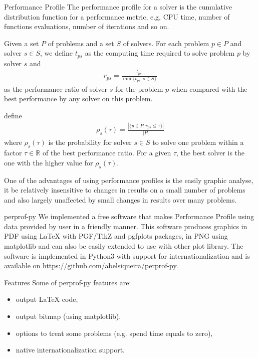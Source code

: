 \documentclass[paperwidth=90cm,paperheight=120cm,portrait]{baposter}
\begin{document}
\begin{poster}
\begin{posterbox}[name=perprof,below=intro]{Performance Profile}
        The performance profile for a solver is the cumulative distribution
        function for a performance metric, e.g, CPU time, number of functions
        evaluations, number of iterations and so on.

        Given a set $P$ of problems and a set $S$ of solvers. For each problem $p
        \in P$ and solver $s \in S$, we define $t_{ps}$ as the computing time
        required to solve problem $p$ by solver $s$ and
        \begin{align*}
          r_{ps} = \frac{t_{ps}}{\min\{t_{ps}: s \in S\}}
        \end{align*}
        as the performance ratio of solver $s$ for the problem $p$ when compared
        with the best performance by any solver on this problem.

        \citeauthor{Dolan2001} define
        \begin{align*}
          \rho_s(\tau) = \frac{| \{p \in P: r_{ps} \leq \tau\} |}{| P |}
        \end{align*}
        where $\rho_s(\tau)$ is the probability for solver $s \in S$ to solve one
        problem within a factor $\tau \in \mathbb{R}$ of the best performance
        ratio. For a given $\tau$, the best solver is the one with the higher
        value for $\rho_s(\tau)$.

        One of the advantages of using performance profiles is the easily graphic
        analyse, it be relatively insensitive to changes in results on a small
        number of problems and also largely unaffected by small changes in
        results over many problems.
        \end{posterbox}

       \begin{posterbox}[name=perprof-py,below=perprof] {perprof-py}
       We implemented a free software that makes Performance
        Profile using data provided by user in a friendly manner. This software
        produces graphics in PDF using LaTeX with PGF/TikZ\nocite{TikZ} and
        pgfplots\nocite{pgfplots} packages, in PNG using
        matplotlib\nocite{Hunter:2007} and can also be easily extended to use with
        other plot library. The software is implemented in Python3 with support
        for internationalization and is available on
        \url{https://github.com/abelsiqueira/perprof-py}.
      \end{posterbox}

    \begin{posterbox}[name=features,below=perprof-py]{Features}
        Some of perprof-py features are:
        \begin{itemize}
          \item output LaTeX code,
          \item output bitmap (using matplotlib),
          \item options to treat some problems (e.g. spend time equals to
            zero),
          \item native internationalization support.


\end{itemize}
\end{posterbox}
\end{poster}
\end{document}
